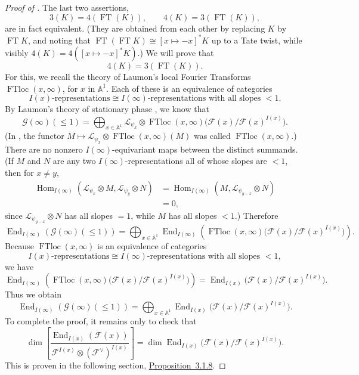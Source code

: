 \begin{proof}[Proof of \chthreethmthreezerofour]
The last two assertions,
\[
  3(K)=4(\operatorname{FT}(K)),\qquad
  4(K)=3(\operatorname{FT}(K)),
\]
are in fact equivalent. (They are obtained from each other by replacing \(K\)
by \(\operatorname{FT}K\), and noting that
\(\operatorname{FT}(\operatorname{FT}K)\cong [x\mapsto -x]^*K\) up to a Tate
twist, while visibly \(4(K)=4([x\mapsto -x]^*K)\).) We will prove that
\[
  4(K)=3(\operatorname{FT}(K)).
\]
For this, we recall the theory of Laumon's local Fourier Transforms
\(\operatorname{FTloc}(x,\infty)\), for \(x\) in \(\mathbb{A}^1\). Each of
these is an equivalence of categories
\[
  I(x)\text{-representations}
  \cong
  I(\infty)\text{-representations with all slopes }<1.
\]
By Laumon's theory of stationary phase \cite[7.4]{Ka-ESDE}, we know that
\[
  \mathcal{G}(\infty)(\leq 1)
  =
  \bigoplus_{x\in\mathbb{A}^1}
  \mathcal{L}_{\psi_x}\otimes
  \operatorname{FTloc}(x,\infty)
  \bigl(\mathcal{F}(x)/\mathcal{F}(x)^{I(x)}\bigr).
\]
(In \cite[7.4.1]{Ka-ESDE}, the functor
\(M\mapsto
\mathcal{L}_{\psi_x}\otimes\operatorname{FTloc}(x,\infty)(M)\) was called
\(\operatorname{FTloc}(x,\infty)\).)
There are no nonzero \(I(\infty)\)-equivariant maps between the distinct
summands. (If \(M\) and \(N\) are any two \(I(\infty)\)-representations all
of whose slopes are \(<1\), then for \(x\ne y\),
\[
\begin{aligned}
  \operatorname{Hom}_{I(\infty)}
  (\mathcal{L}_{\psi_x}\otimes M,\mathcal{L}_{\psi_y}\otimes N)
  &=
  \operatorname{Hom}_{I(\infty)}
  (M,\mathcal{L}_{\psi_{y-x}}\otimes N)\\
  &=0,
\end{aligned}
\]
since \(\mathcal{L}_{\psi_{y-x}}\otimes N\) has all slopes \(=1\), while
\(M\) has all slopes \(<1\).) Therefore
\[
  \operatorname{End}_{I(\infty)}(\mathcal{G}(\infty)(\leq 1))
  =
  \bigoplus_{x\in\mathbb{A}^1}
  \operatorname{End}_{I(\infty)}
  \left(
  \operatorname{FTloc}(x,\infty)
  \bigl(\mathcal{F}(x)/\mathcal{F}(x)^{I(x)}\bigr)
  \right).
\]
Because \(\operatorname{FTloc}(x,\infty)\) is an equivalence of categories
\[
  I(x)\text{-representations}
  \cong
  I(\infty)\text{-representations with all slopes }<1,
\]
we have
\[
  \operatorname{End}_{I(\infty)}
  \left(
  \operatorname{FTloc}(x,\infty)
  \bigl(\mathcal{F}(x)/\mathcal{F}(x)^{I(x)}\bigr)
  \right)
  =
  \operatorname{End}_{I(x)}
  \bigl(\mathcal{F}(x)/\mathcal{F}(x)^{I(x)}\bigr).
\]
Thus we obtain
\[
  \operatorname{End}_{I(\infty)}(\mathcal{G}(\infty)(\leq 1))
  =
  \bigoplus_{x\in\mathbb{A}^1}
  \operatorname{End}_{I(x)}
  \bigl(\mathcal{F}(x)/\mathcal{F}(x)^{I(x)}\bigr).
\]
To complete the proof, it remains only to check that
\[
  \dim\left[
  \frac{\operatorname{End}_{I(x)}(\mathcal{F}(x))}
       {\mathcal{F}^{I(x)}\otimes(\mathcal{F}^{\vee})^{I(x)}}\right]
  =
  \dim\operatorname{End}_{I(x)}
  \bigl(\mathcal{F}(x)/\mathcal{F}(x)^{I(x)}\bigr).
\]
This is proven in the following section,
\hyperref[prop:3.1.8]{Proposition~3.1.8}.
\end{proof}

